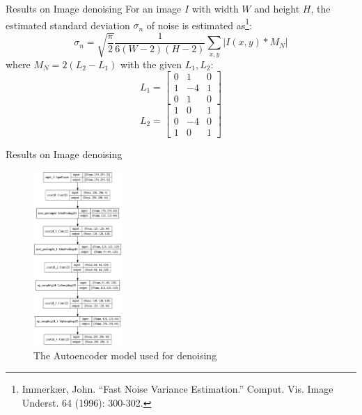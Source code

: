 \documentclass{libs/ufc_format}
\begin{document}

\begin{frame}{Results on Image denoising}
    For an image $I$ with width $W$ and height $H$, the estimated standard deviation $\sigma_n$ of noise is estimated as\footnote[frame]{Immerkær, John. “Fast Noise Variance Estimation.” Comput. Vis. Image \\ Underst. 64 (1996): 300-302.}:
\begin{equation}
    \sigma_n = \sqrt{\frac{\pi}{2}}\frac{1}{6(W-2)(H-2)}\sum_{x,y}|{I(x,y)*M_N}|
\end{equation}
    where $M_N = 2(L_2-L_1)$ with the given $L_1, L_2$:
\begin{equation}
    L_1 = \begin{bmatrix}
0 & 1 & 0\\
1 & -4 & 1\\
0 & 1 & 0
\end{bmatrix}
\end{equation}
\begin{equation}
    L_2 = \begin{bmatrix}
1 & 0 & 1\\
0 & -4 & 0\\
1 & 0 & 1
\end{bmatrix}
\end{equation}

\end{frame}


\begin{frame}{Results on Image denoising}
\begin{figure}
\centering
\includegraphics[width=0.3\textwidth]{libs/model.png}
\caption{The Autoencoder model used for denoising}
\end{figure}

\end{frame}
\end{document}
